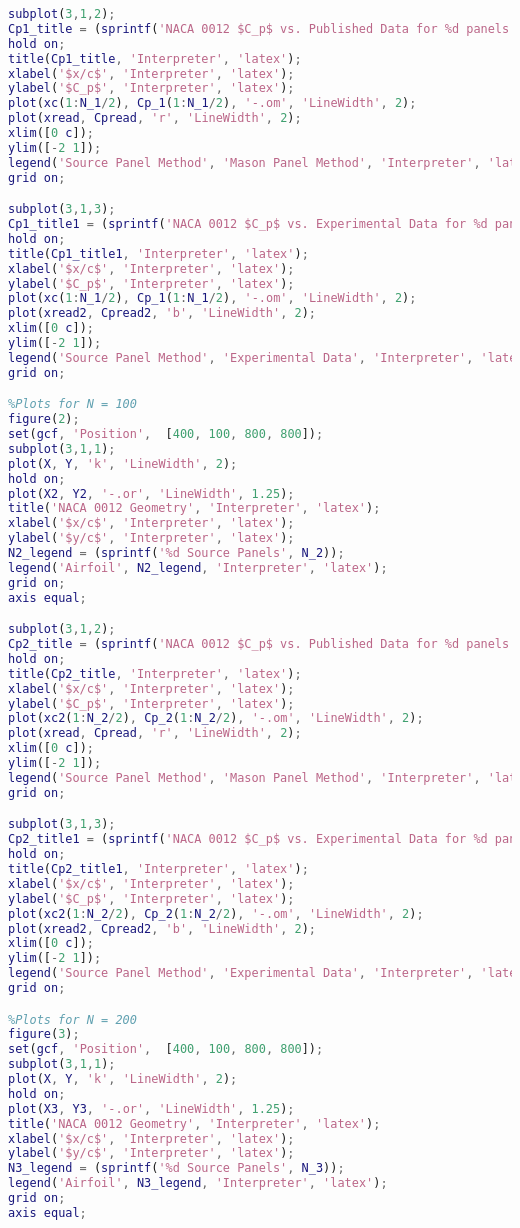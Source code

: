 \documentclass[12pt]{article}
\begin{document}
\begin{lstlisting}[language=Matlab]
subplot(3,1,2);
Cp1_title = (sprintf('NACA 0012 $C_p$ vs. Published Data for %d panels', N_1));
hold on;
title(Cp1_title, 'Interpreter', 'latex');
xlabel('$x/c$', 'Interpreter', 'latex');
ylabel('$C_p$', 'Interpreter', 'latex');
plot(xc(1:N_1/2), Cp_1(1:N_1/2), '-.om', 'LineWidth', 2);
plot(xread, Cpread, 'r', 'LineWidth', 2);
xlim([0 c]);
ylim([-2 1]);
legend('Source Panel Method', 'Mason Panel Method', 'Interpreter', 'latex');
grid on;

subplot(3,1,3);
Cp1_title1 = (sprintf('NACA 0012 $C_p$ vs. Experimental Data for %d panels', N_1));
hold on;
title(Cp1_title1, 'Interpreter', 'latex');
xlabel('$x/c$', 'Interpreter', 'latex');
ylabel('$C_p$', 'Interpreter', 'latex');
plot(xc(1:N_1/2), Cp_1(1:N_1/2), '-.om', 'LineWidth', 2);
plot(xread2, Cpread2, 'b', 'LineWidth', 2);
xlim([0 c]);
ylim([-2 1]);
legend('Source Panel Method', 'Experimental Data', 'Interpreter', 'latex');
grid on;

%Plots for N = 100
figure(2);
set(gcf, 'Position',  [400, 100, 800, 800]);
subplot(3,1,1);
plot(X, Y, 'k', 'LineWidth', 2);
hold on;
plot(X2, Y2, '-.or', 'LineWidth', 1.25);
title('NACA 0012 Geometry', 'Interpreter', 'latex');
xlabel('$x/c$', 'Interpreter', 'latex');
ylabel('$y/c$', 'Interpreter', 'latex');
N2_legend = (sprintf('%d Source Panels', N_2));
legend('Airfoil', N2_legend, 'Interpreter', 'latex');
grid on;
axis equal;

subplot(3,1,2);
Cp2_title = (sprintf('NACA 0012 $C_p$ vs. Published Data for %d panels', N_2));
hold on;
title(Cp2_title, 'Interpreter', 'latex');
xlabel('$x/c$', 'Interpreter', 'latex');
ylabel('$C_p$', 'Interpreter', 'latex');
plot(xc2(1:N_2/2), Cp_2(1:N_2/2), '-.om', 'LineWidth', 2);
plot(xread, Cpread, 'r', 'LineWidth', 2);
xlim([0 c]);
ylim([-2 1]);
legend('Source Panel Method', 'Mason Panel Method', 'Interpreter', 'latex');
grid on;

subplot(3,1,3);
Cp2_title1 = (sprintf('NACA 0012 $C_p$ vs. Experimental Data for %d panels', N_2));
hold on;
title(Cp2_title1, 'Interpreter', 'latex');
xlabel('$x/c$', 'Interpreter', 'latex');
ylabel('$C_p$', 'Interpreter', 'latex');
plot(xc2(1:N_2/2), Cp_2(1:N_2/2), '-.om', 'LineWidth', 2);
plot(xread2, Cpread2, 'b', 'LineWidth', 2);
xlim([0 c]);
ylim([-2 1]);
legend('Source Panel Method', 'Experimental Data', 'Interpreter', 'latex');
grid on;

%Plots for N = 200
figure(3);
set(gcf, 'Position',  [400, 100, 800, 800]);
subplot(3,1,1);
plot(X, Y, 'k', 'LineWidth', 2);
hold on;
plot(X3, Y3, '-.or', 'LineWidth', 1.25);
title('NACA 0012 Geometry', 'Interpreter', 'latex');
xlabel('$x/c$', 'Interpreter', 'latex');
ylabel('$y/c$', 'Interpreter', 'latex');
N3_legend = (sprintf('%d Source Panels', N_3));
legend('Airfoil', N3_legend, 'Interpreter', 'latex');
grid on;
axis equal;


\end{lstlisting}
\end{document}
